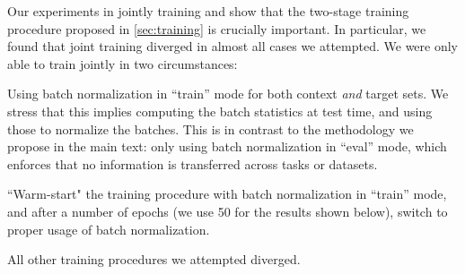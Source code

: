 \documentclass{article}
\theoremstyle{definition}
\begin{document}
Our experiments in jointly training  and  show that the two-stage training procedure proposed in \cref{sec:training} is crucially important. In particular, we found that joint training diverged in almost all cases we attempted. We were only able to train jointly in two circumstances:
\begin{inlinelist}
\item Using batch normalization in ``train'' mode for both context \textit{and} target sets. We stress that this implies computing the batch statistics at test time, and using those to normalize the batches. This is in contrast to the methodology we propose in the main text: only using batch normalization in ``eval'' mode, which enforces that no information is transferred across tasks or datasets.
\item ``Warm-start" the training procedure with batch normalization in ``train'' mode, and after a number of epochs (we use 50 for the results shown below), switch to proper usage of batch normalization.
\end{inlinelist}
All other training procedures we attempted diverged.
\end{document}
